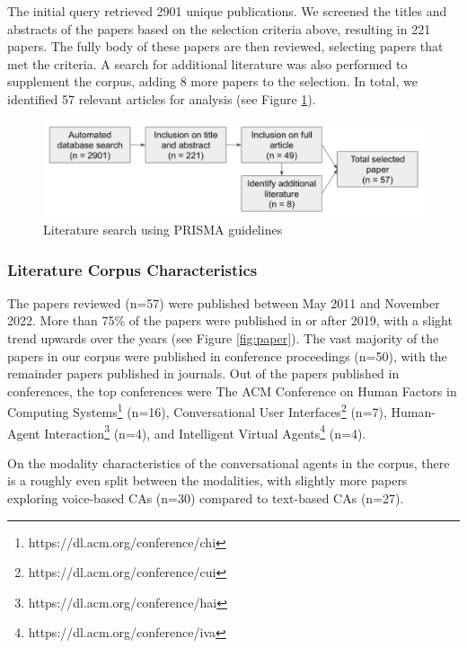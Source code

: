 \documentclass[sigconf,screen,review, anonymous]{acmart}
\begin{document}
The initial query retrieved 2901 unique publications. We screened the titles and abstracts of the papers based on the selection criteria above, resulting in 221 papers. The fully body of these papers are then reviewed, selecting papers that met the criteria. A search for additional literature was also performed to supplement the corpus, adding 8 more papers to the selection. In total, we identified 57 relevant articles for analysis (see Figure \ref{fig:prisma}).

\begin{figure}[h]
  \centering
  \includegraphics[width=1\columnwidth]{fig-prisma.png}
  \caption{Literature search using PRISMA guidelines}
  \label{fig:prisma}
\end{figure}

\subsubsection*{Literature Corpus Characteristics}

The papers reviewed (n=57) were published between May 2011 and November 2022. More than 75\% of the papers were published in or after 2019, with a slight trend upwards over the years (see Figure \ref{fig:paper}). The vast majority of the papers in our corpus were published in conference proceedings (n=50), with the remainder papers published in journals. Out of the papers published in conferences, the top conferences were The ACM Conference on Human Factors in Computing Systems\footnote{https://dl.acm.org/conference/chi} (n=16), Conversational User Interfaces\footnote{https://dl.acm.org/conference/cui} (n=7), Human-Agent Interaction\footnote{https://dl.acm.org/conference/hai} (n=4), and Intelligent Virtual Agents\footnote{https://dl.acm.org/conference/iva} (n=4). 

On the modality characteristics of the conversational agents in the corpus, there is a roughly even split between the modalities, with slightly more papers exploring voice-based CAs (n=30) compared to text-based CAs (n=27).
\end{document}
